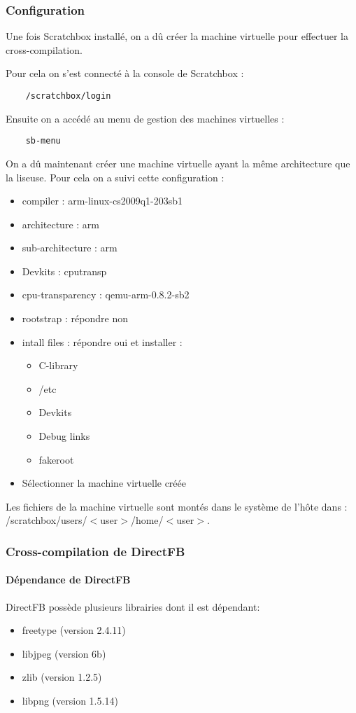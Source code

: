 \subsubsection{Configuration}

Une fois Scratchbox installé, on a dû créer la machine virtuelle pour effectuer la cross-compilation.

Pour cela on s'est connecté à la console de Scratchbox : 
\begin{lstlisting}
	/scratchbox/login
\end{lstlisting}
Ensuite on a accédé au menu de gestion des machines virtuelles : 
\begin{lstlisting}
	sb-menu
\end{lstlisting}
On a dû maintenant créer une machine virtuelle ayant la même architecture que la liseuse. 
Pour cela on a suivi cette configuration : 
\begin{itemize}
\renewcommand{\labelitemi}{$\bullet$}
	\item compiler : arm-linux-cs2009q1-203sb1
	\item architecture : arm
	\item sub-architecture : arm
	\item Devkits : cputransp
	\item cpu-transparency :  qemu-arm-0.8.2-sb2
	\item rootstrap : répondre non
	\item intall files : répondre oui et installer :
		\begin{itemize}
			\item C-library
			\item /etc
			\item Devkits 
			\item Debug links
			\item fakeroot
		\end{itemize}
	\item Sélectionner la machine virtuelle créée
\end{itemize}

Les fichiers de la machine virtuelle sont montés dans le système de l'hôte dans : 
/scratchbox/users/$<$user$>$/home/$<$user$>$.

\subsubsection{Cross-compilation de DirectFB}

\paragraph{Dépendance de DirectFB}
DirectFB possède plusieurs librairies dont il est dépendant: 
	\begin{itemize}
		\item freetype (version 2.4.11)
		\item libjpeg (version 6b)
		\item zlib (version 1.2.5)
		\item libpng (version 1.5.14)
	\end{itemize}


